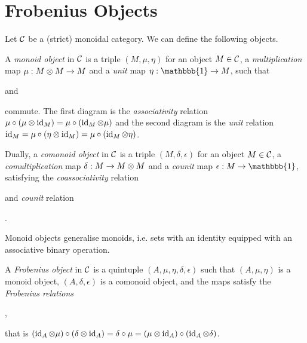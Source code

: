 \section{Frobenius Objects}
\label{sec:2.2}



Let $\mathcal{C}$ be a (strict) monoidal category. We can define the following objects.

\begin{definition}
    A \textit{monoid object} in $\mathcal{C}$ is a triple $(M,\mu,\eta)$ for an object $M \in \mathcal{C}$, a \textit{multiplication} map $\mu: M \otimes M \to M$ and a \textit{unit} map $\eta: \mathbbb{1} \to M$, such that
    \begin{center}
        
    \end{center}
    and
    \begin{center}
        
    \end{center}
    commute. The first diagram is the \textit{associativity} relation $\mu \circ (\mu \otimes \operatorname{id}_M) = \mu \circ (\operatorname{id}_M \otimes \mu)$ and the second diagram is the \textit{unit} relation $\operatorname{id}_M = \mu \circ (\eta \otimes \operatorname{id}_M) = \mu \circ (\operatorname{id}_M \otimes \eta)$.

    Dually, a \textit{comonoid object} in $\mathcal{C}$ is a triple $(M,\delta,\epsilon)$ for an object $M \in \mathcal{C}$, a \textit{comultiplication} map $\delta: M \to M \otimes M$ and a \textit{counit} map $\epsilon: M \to \mathbbb{1}$, satisfying the \textit{coassociativity} relation
    \begin{center}
        
    \end{center}
    and \textit{counit} relation
    \begin{center}
        .
    \end{center}
\end{definition}

Monoid objects generalise monoids, i.e. sets with an identity equipped with an associative binary operation.

\begin{definition}
    A \textit{Frobenius object} in $\mathcal{C}$ is a quintuple $(A,\mu,\eta,\delta,\epsilon)$ such that $(A,\mu,\eta)$ is a monoid object, $(A,\delta,\epsilon)$ is a comonoid object, and the maps satisfy the \textit{Frobenius relations}
    \begin{center}
        ,
    \end{center}
    that is $(\operatorname{id}_A \otimes \mu) \circ (\delta \otimes \operatorname{id}_A) = \delta \circ \mu = (\mu \otimes \operatorname{id}_A) \circ (\operatorname{id}_A \otimes \delta)$.
\end{definition}


